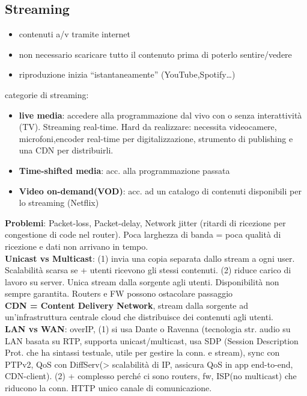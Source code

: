 \documentclass[8pt,a4paper]{article}
\begin{document}
\begin{multicols}{5}
    \subsection{Streaming}
    \begin{itemize}
      \item contenuti a/v tramite internet
      \item non necessario scaricare tutto il contenuto prima di poterlo sentire/vedere
      \item riproduzione inizia “istantaneamente” (YouTube,Spotify…)
    \end{itemize}

     categorie di streaming:
    \begin{itemize}
      \item \textbf{live media}: accedere alla programmazione dal vivo con o senza interattività (TV). Streaming real-time. Hard da realizzare: necessita videocamere, microfoni,encoder real-time per digitalizzazione, strumento di publishing e una CDN per distribuirli.
      \item \textbf{Time-shifted media}: acc. alla programmazione passata
      \item \textbf{Video on-demand(VOD)}: acc. ad un catalogo di contenuti disponibili per lo streaming (Netflix)
    \end{itemize}
    \textbf{Problemi}: Packet-loss, Packet-delay, Network jitter (ritardi di ricezione per congestione di code nel router). Poca larghezza di banda = poca qualità di ricezione e dati non arrivano in tempo.\\
    \textbf{Unicast vs Multicast}: (1) invia una copia separata dallo stream a ogni user. Scalabilità scarsa se + utenti ricevono gli stessi contenuti. (2) riduce carico di lavoro su server. Unica stream dalla sorgente agli utenti. Disponibilità non sempre garantita. Routers e FW possono ostacolare passaggio\\
    \textbf{CDN = Content Delivery Network}, stream dalla sorgente ad un’infrastruttura centrale cloud che distribuisce dei contenuti agli utenti.\\
    \textbf{LAN vs WAN}: overIP, (1) si usa Dante o Ravenna (tecnologia str. audio su LAN basata su RTP, supporta unicast/multicast, usa SDP (Session Description Prot. che ha sintassi testuale, utile per gestire la conn. e stream), sync con PTPv2, QoS con DiffServ(> scalabilità di IP, assicura QoS in app end-to-end, CDN-client). (2) + complesso perché ci sono routers, fw, ISP(no multicast) che riducono la conn. HTTP unico canale di comunicazione.\\

\end{multicols}
\end{document}
